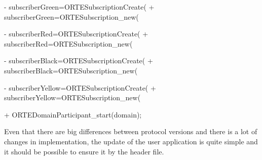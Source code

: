 - subscriberGreen=ORTESubscriptionCreate(
+ subscriberGreen=ORTESubscription_new(

- subscriberRed=ORTESubscriptionCreate(
+ subscriberRed=ORTESubscription_new(

- subscriberBlack=ORTESubscriptionCreate(
+ subscriberBlack=ORTESubscription_new(

- subscriberYellow=ORTESubscriptionCreate(
+ subscriberYellow=ORTESubscription_new(

+ ORTEDomainParticipant_start(domain);
\endtt

Even that there are big differences between  protocol versions and there is a lot of changes in  implementation, the update of the user application is quite simple and it should be possible to ensure it by the header file.

